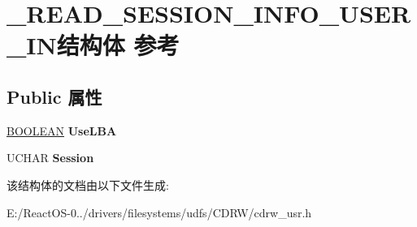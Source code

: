 \hypertarget{struct___r_e_a_d___s_e_s_s_i_o_n___i_n_f_o___u_s_e_r___i_n}{}\section{\+\_\+\+R\+E\+A\+D\+\_\+\+S\+E\+S\+S\+I\+O\+N\+\_\+\+I\+N\+F\+O\+\_\+\+U\+S\+E\+R\+\_\+\+I\+N结构体 参考}
\label{struct___r_e_a_d___s_e_s_s_i_o_n___i_n_f_o___u_s_e_r___i_n}
\subsection*{Public 属性}
\begin{DoxyCompactItemize}
\item 
\mbox{\label{struct___r_e_a_d___s_e_s_s_i_o_n___i_n_f_o___u_s_e_r___i_n_a52296a7ae0bef08ad99e2d5806acc582}} 
\hyperlink{_processor_bind_8h_a112e3146cb38b6ee95e64d85842e380a}{B\+O\+O\+L\+E\+AN} {\bfseries Use\+L\+BA}
\item 
\mbox{\label{struct___r_e_a_d___s_e_s_s_i_o_n___i_n_f_o___u_s_e_r___i_n_a37d4e003556a2ef1ef4c86b9855744e3}} 
U\+C\+H\+AR {\bfseries Session}
\end{DoxyCompactItemize}


该结构体的文档由以下文件生成\+:\begin{DoxyCompactItemize}
\item 
E\+:/\+React\+O\+S-\/0../drivers/filesystems/udfs/\+C\+D\+R\+W/cdrw\+\_\+usr.\+h\end{DoxyCompactItemize}
